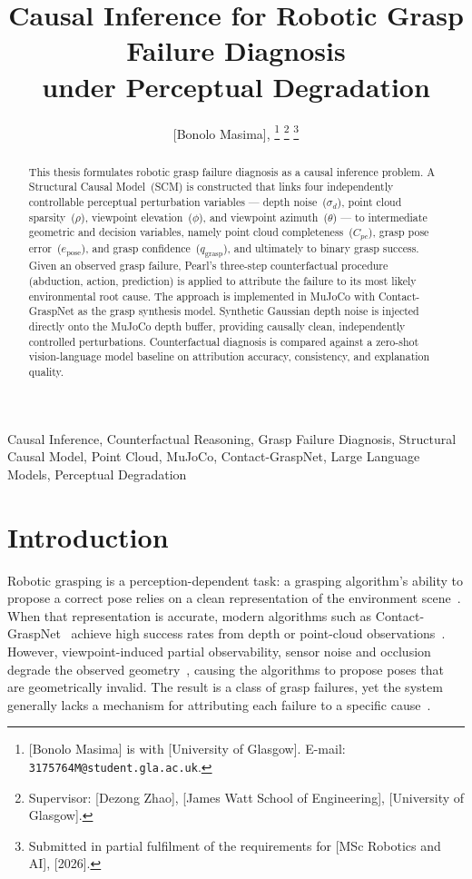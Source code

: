 \documentclass[journal]{IEEEtran}
\title{Causal Inference for Robotic Grasp Failure Diagnosis\\
       under Perceptual Degradation}
\author{[Bonolo Masima],%
  \IEEEmembership{Student~Member,~IEEE}%
  \thanks{[Bonolo Masima] is with [University of Glasgow]. E-mail: \texttt{3175764M@student.gla.ac.uk}.}%
  \thanks{Supervisor: [Dezong Zhao], [James Watt School of Engineering], [University of Glasgow].}%
  \thanks{Submitted in partial fulfilment of the requirements for
          [MSc Robotics and AI], [2026].}}
\begin{document}
\maketitle

\begin{abstract}
This thesis formulates robotic grasp failure diagnosis as a causal
inference problem.  A Structural Causal Model~(SCM) is constructed
that links four independently controllable perceptual perturbation
variables --- depth noise~($\sigma_d$), point cloud
sparsity~($\rho$), viewpoint elevation~($\phi$), and viewpoint
azimuth~($\theta$) --- to intermediate geometric and decision
variables, namely point cloud completeness~($C_{pc}$), grasp
pose error~($e_{\text{pose}}$), and grasp confidence~($q_{\text{grasp}}$),
and ultimately to binary grasp success.  Given an observed grasp
failure, Pearl's three-step counterfactual procedure (abduction,
action, prediction) is applied to attribute the failure to its
most likely environmental root cause.  The approach is implemented
in MuJoCo with Contact-GraspNet as the grasp synthesis model.
Synthetic Gaussian depth noise is injected directly onto the
MuJoCo depth buffer, providing causally clean, independently
controlled perturbations.  Counterfactual diagnosis is compared
against a zero-shot vision-language model baseline on attribution
accuracy, consistency, and explanation quality.
\end{abstract}

\begin{IEEEkeywords}
Causal Inference, Counterfactual Reasoning, Grasp Failure Diagnosis,
Structural Causal Model, Point Cloud, MuJoCo, Contact-GraspNet,
Large Language Models, Perceptual Degradation
\end{IEEEkeywords}

\section{Introduction}
\label{sec:intro}

Robotic grasping is a perception-dependent task: a grasping
algorithm's ability to propose a correct pose relies on a clean
representation of the environment scene~\cite{bohg2014data}.
When that representation is accurate, modern algorithms such as
Contact-GraspNet~\cite{sundermeyer2021contact} achieve high success
rates from depth or point-cloud observations~\cite{fang2020graspnet}.
However, viewpoint-induced partial observability, sensor noise and
occlusion degrade the observed geometry~\cite{khoshelham2011accuracy,
nguyen2012modeling}, causing the algorithms to propose poses that
are geometrically invalid.  The result is a class of grasp failures,
yet the system generally lacks a mechanism for attributing each
failure to a specific cause~\cite{murali2020grasp}.
\end{document}
